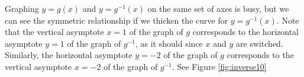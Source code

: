 {\begin{enumerate}
Graphing $y=g(x)$ and  $y = g^{-1}(x)$ on the same set of axes is busy, but we can see the symmetric relationship if we thicken the curve for $y=g^{-1}(x)$.  Note that the vertical asymptote $x=1$ of the graph of $g$ corresponds to the horizontal asymptote $y=1$ of the graph of $g^{-1}$, as it should since $x$ and $y$ are switched.  Similarly, the horizontal asymptote $y=-2$ of the graph of $g$ corresponds to the vertical asymptote $x=-2$ of the graph of $g^{-1}$. See Figure \ref{fig:inverse10}




\end{enumerate}
}

